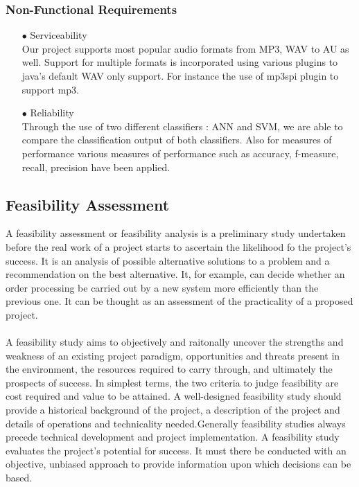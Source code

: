\subsubsection{Non-Functional Requirements}
    \begin{itemize}
    \item[$\bullet$] Serviceability\\
        Our project supports most popular audio formats from MP3, WAV to AU as well. Support for multiple formats is incorporated using various plugins to java’s default WAV only support. For instance the use of mp3spi plugin to
         support mp3.
    \item[$\bullet$] Reliability\\
        Through the use of two different classifiers : ANN and SVM, we are able to compare the classification output of both classifiers. Also for measures of performance various measures of performance such as
        accuracy, f-measure, recall, precision have been applied.
    \end{itemize}

\subsection{Feasibility Assessment}
A feasibility assessment or feasibility analysis is a preliminary study undertaken before the real work of a project starts to ascertain the likelihood fo the project's success.
It is an analysis of possible alternative solutions to a problem and a recommendation on the best alternative. It, for example, can decide whether an order processing be carried out by a new system more 
efficiently than the previous one. It can be thought as an assessment of the practicality of a proposed project.\\
\\
A feasibility study aims to objectively and raitonally uncover the strengths and weakness of an existing project paradigm, opportunities and threats present in the environment, the resources required to carry through, and ultimately the prospects
of success. In simplest terms, the two criteria to judge feasibility are cost required and value to be attained. A well-designed feasibility study should provide a historical background of the project,
a description of the project and details of operations and technicality needed.Generally feasibility studies always precede technical development and project implementation. A feasibility study evaluates the project's potential for success. It must there be
conducted with an objective, unbiased approach to provide information upon which decisions can be based.

